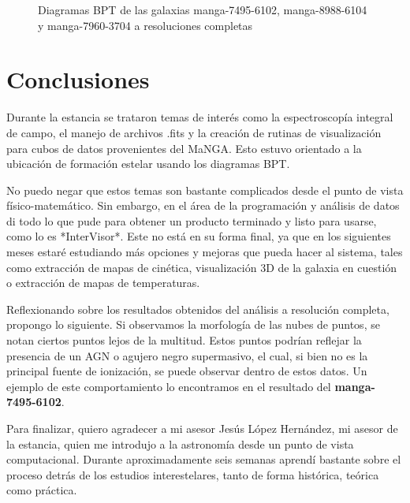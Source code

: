 \documentclass[10pt,twocolumn,a4paper]{opticajnl}
\begin{document}
\begin{figure}[h!]
    \caption{Diagramas BPT de las galaxias manga-7495-6102, manga-8988-6104 y manga-7960-3704 a resoluciones completas}
    \label{fig:recent_files}
\end{figure}

\section*{Conclusiones}
Durante la estancia se trataron temas de interés como la espectroscopía integral de campo, el manejo de archivos .fits y la creación de rutinas de visualización para cubos de datos provenientes del MaNGA. Esto estuvo orientado a la ubicación de formación estelar usando los diagramas BPT.

No puedo negar que estos temas son bastante complicados desde el punto de vista físico-matemático. Sin embargo, en el área de la programación y análisis de datos di todo lo que pude para obtener un producto terminado y listo para usarse, como lo es *InterVisor*. Este no está en su forma final, ya que en los siguientes meses estaré estudiando más opciones y mejoras que pueda hacer al sistema, tales como extracción de mapas de cinética, visualización 3D de la galaxia en cuestión o extracción de mapas de temperaturas.

Reflexionando sobre los resultados obtenidos del análisis a resolución completa, propongo lo siguiente. Si observamos la morfología de las nubes de puntos, se notan ciertos puntos lejos de la multitud. Estos puntos podrían reflejar la presencia de un AGN o agujero negro supermasivo, el cual, si bien no es la principal fuente de ionización, se puede observar dentro de estos datos. Un ejemplo de este comportamiento lo encontramos en el resultado del \textbf{manga-7495-6102}.

Para finalizar, quiero agradecer a mi asesor Jesús López Hernández, mi asesor de la estancia, quien me introdujo a la astronomía desde un punto de vista computacional. Durante aproximadamente seis semanas aprendí bastante sobre el proceso detrás de los estudios interestelares, tanto de forma histórica, teórica como práctica.
\end{document}
